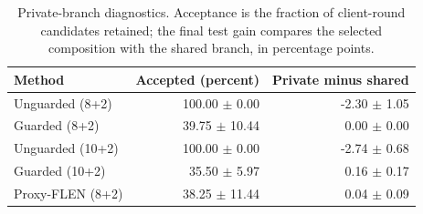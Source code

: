 \begin{table}[t]
\caption{Private-branch diagnostics. Acceptance is the fraction of client-round candidates retained; the final test gain compares the selected composition with the shared branch, in percentage points.}
\label{tab:revision-gate}
\centering
\small
\begin{tabular}{lrr}
\toprule
Method & Accepted (percent) & Private minus shared \\
\midrule
Unguarded (8+2) & 100.00 $\pm$ 0.00 & -2.30 $\pm$ 1.05 \\
Guarded (8+2) & 39.75 $\pm$ 10.44 & 0.00 $\pm$ 0.00 \\
Unguarded (10+2) & 100.00 $\pm$ 0.00 & -2.74 $\pm$ 0.68 \\
Guarded (10+2) & 35.50 $\pm$ 5.97 & 0.16 $\pm$ 0.17 \\
Proxy-FLEN (8+2) & 38.25 $\pm$ 11.44 & 0.04 $\pm$ 0.09 \\
\bottomrule
\end{tabular}
\end{table}
